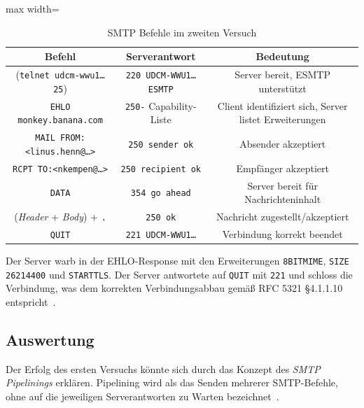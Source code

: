 \begin{table}[h]
    \centering
    \begin{adjustbox}{max width=\textwidth}
        \begin{tabular}{|c|c|c|}
            \hline
            \textbf{Befehl} & \textbf{Serverantwort} & \textbf{Bedeutung} \\
            \hline
            (\texttt{telnet udcm-wwu1\ldots{} 25}) & \texttt{220 UDCM-WWU1\ldots{} ESMTP} & Server bereit, ESMTP unterstützt \\
            \hline
            \texttt{EHLO monkey.banana.com} & \texttt{250-} Capability-Liste & Client identifiziert sich, Server listet Erweiterungen \\
            \hline
            \texttt{MAIL FROM:<linus.henn@\ldots{}>} & \texttt{250 sender ok} & Absender akzeptiert \\
            \hline
            \texttt{RCPT TO:<nkempen@\ldots{}>} & \texttt{250 recipient ok} & Empfänger akzeptiert \\
            \hline
            \texttt{DATA} & \texttt{354 go ahead} & Server bereit für Nachrichteninhalt \\
            \hline
            (\textit{Header} + \textit{Body}) + \texttt{.} & \texttt{250 ok} & Nachricht zugestellt/akzeptiert \\
            \hline
            \texttt{QUIT} & \texttt{221 UDCM-WWU1\ldots{}} & Verbindung korrekt beendet \\
            \hline
        \end{tabular}
    \end{adjustbox}
    \caption{SMTP Befehle im zweiten Versuch}\label{tab:smtp_dialog}
\end{table}

Der Server warb in der EHLO-Response mit den Erweiterungen \texttt{8BITMIME}, \texttt{SIZE 26214400} und \texttt{STARTTLS}.
Der Server antwortete auf \texttt{QUIT} mit \texttt{221} und schloss die Verbindung, was dem korrekten Verbindungsabbau gemäß RFC 5321 §4.1.1.10 entspricht~\cite{rfc5321_smtp}.

\subsection*{Auswertung}

Der Erfolg des ersten Versuchs könnte sich durch das Konzept des \textit{SMTP Pipelinings} erklären.
Pipelining wird als das Senden mehrerer SMTP-Befehle, ohne auf die jeweiligen Serverantworten zu Warten bezeichnet~\cite{rfc2920_smtp_pipelining}.

